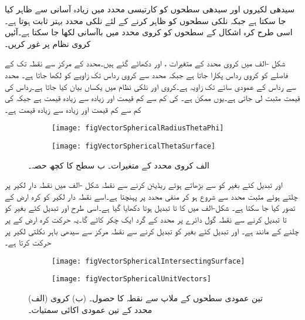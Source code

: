 سیدھی لکیروں اور سیدھی سطحوں کو کارتیسی محدد میں زیادہ آسانی سے ظاہر کیا جا سکتا ہے جبکہ نلکی سطحوں کو ظاہر کرنے کے لئے نلکی محدد بہتر ثابت ہوتا ہے۔اسی طرح کرہ اشکال کے سطحوں کو کروی محدد میں باآسانی لکھا جا سکتا ہے۔آئیں کروی نظام پر غور کریں۔

شکل -الف میں کروی محدد کے متغیرات ،  اور  دکھائے گئے ہیں۔محدد کے مرکز سے نقطہ  تک کے فاصلے  کو کروی رداس پکارا جاتا ہے جبکہ  محدد سے کروی رداس تک زاویے کو  لکھا جاتا ہے۔ محدد سے رداس کے عمودی سائے تک زاویہ  ہے۔کروی اور نلکی نظام میں  یکساں بیان کیا جاتا ہے۔رداس کی  قیمت مثبت لی جاتی ہے۔یوں  ممکن ہے۔ کی کم سے کم قیمت  اور  زیادہ سے زیادہ  قیمت  ہے جبکہ  کی کم سے کم قیمت  اور زیادہ سے زیادہ قیمت  ہے۔

\begin{figure}
\centering
\begin{subfigure}{0.5\textwidth}
\centering
\texttt{[image: figVectorSphericalRadiusThetaPhi]}
\end{subfigure}%
%
\begin{subfigure}{0.5\textwidth}
\centering
\texttt{[image: figVectorSphericalThetaSurface]}
\end{subfigure}%
\caption{{الف} کروی محدد کے متغیرات۔ {ب}  سطح  کا کچھ حصہ۔}
\label{شکل_سمتیہ_کروی_محدد_متغیرات}
\end{figure}
%
 اور  تبدیل کئے بغیر  کو  سے بڑھاتے ہوئے  ریڈیئن  کرنے سے نقطہ   شکل -الف میں نقطہ دار لکیر پر چلتے ہوئے  مثبت  محدد سے شروع ہو کر  منفی  محدد پر پہنچتا ہے۔اسے  نقطہ دار لکیر کو  کرہ ارض کے  تصور  کیا جا سکتا ہے۔  شکل-الف میں  کا  تا  تبدیل ہوتا دکھایا گیا ہے۔اسی طرح  اور  تبدیل کئے بغیر  کو  تا  تبدیل کرنے سے  نقطہ  گول دائرے پر  محدد کے گرد ایک چکر کاٹے گا۔یہ حرکت کرہ ارض کے  پر چلنے کے  مانند ہے۔ اور  تبدیل کئے بغیر  کو تبدیل کرنے سے نقطہ  مرکز سے  سیدھی باہر نکلتی لکیر پر حرکت کرتا ہے۔ 

\begin{figure}
\centering
\begin{subfigure}{0.5\textwidth}
\centering
\texttt{[image: figVectorSphericalIntersectingSurface]}
\end{subfigure}%
%
\begin{subfigure}{0.5\textwidth}
\centering
\texttt{[image: figVectorSphericalUnitVectors]}
\end{subfigure}%
\caption{(الف) تین عمودی سطحوں کے ملاپ سے نقطہ  کا حصول۔ (ب) کروی محدد کے تین عمودی اکائی سمتیات۔}
\label{شکل_سمتیہ_کروی_تین_سطحوں_کا_مالپ}
\end{figure}

